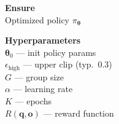 \documentclass[11pt]{article}
\begin{document}
\begin{algorithm}[p]\small
\caption{CISPO (Clipped Importance Sampling Policy Optimization)}\label{alg:cispo}
\vspace{2pt}
\noindent
\begin{minipage}[t]{0.28\linewidth}
\renewcommand{\arraystretch}{1.12}
\textbf{Ensure} \\[2pt]
Optimized policy $\pi_{\boldsymbol{\theta}}$

\vspace{6pt}
\textbf{Hyperparameters} \\[2pt]
$\boldsymbol{\theta}_0$ — init policy params \\
$\epsilon_{\text{high}}$ — upper clip (typ.\ $0.3$) \\
$G$ — group size \\
$\alpha$ — learning rate \\
$K$ — epochs \\
$R(\mathbf{q}, \mathbf{o})$ — reward function


\end{minipage}
\end{algorithm}
\end{document}
